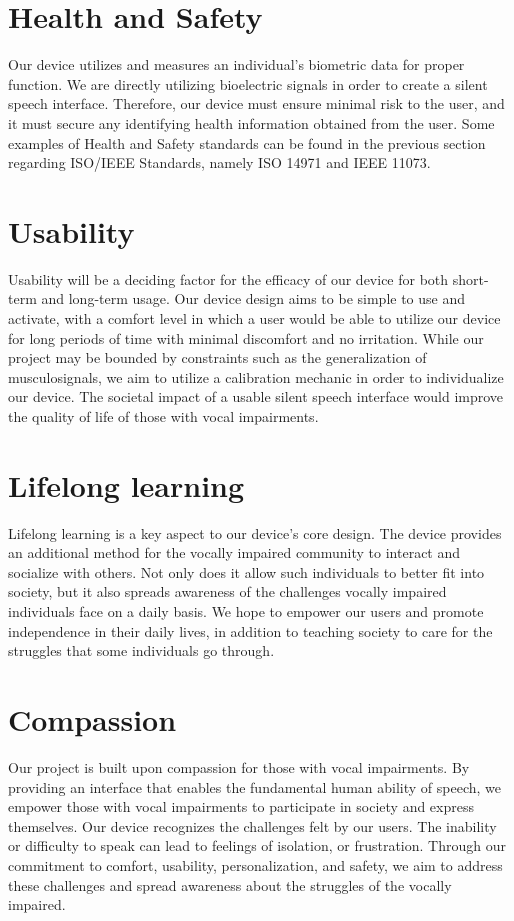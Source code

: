 \section{Health and Safety}
Our device utilizes and measures an individual's biometric data for proper function. We are directly utilizing bioelectric signals
 in order to create a silent speech interface. Therefore, our device must ensure minimal risk to the user, and it must secure any
 identifying health information obtained from the user. Some examples of Health and Safety standards can be found in the previous
 section regarding ISO/IEEE Standards, namely ISO 14971 and IEEE 11073.

\section{Usability} 
Usability will be a deciding factor for the efficacy of our device for both short-term and long-term usage. Our device design aims to be simple to use and activate,
 with a comfort level in which a user would be able to utilize our device for long periods of time with minimal discomfort and no irritation. While our project may be bounded by constraints such
 as the generalization of musculosignals, we aim to utilize a calibration mechanic in order to individualize our device. The societal impact of a usable silent speech interface would
 improve the quality of life of those with vocal impairments.

\section{Lifelong learning}
Lifelong learning is a key aspect to our device's core design. The device provides an additional method for the vocally impaired community to interact and socialize with others.
 Not only does it allow such individuals to better fit into society, but it also spreads awareness of the challenges vocally impaired individuals face on a daily basis. We hope to
empower our users and promote independence in their daily lives, in addition to teaching society to care for the struggles that some individuals go through.


\section{Compassion}
Our project is built upon compassion for those with vocal impairments. By providing an interface that enables the fundamental human
 ability of speech, we empower those with vocal impairments to participate in society and express themselves. Our device recognizes
 the challenges felt by our users. The inability or difficulty to speak can lead to feelings of isolation, or frustration. Through
 our commitment to comfort, usability, personalization, and safety, we aim to address these challenges and spread awareness about
 the struggles of the vocally impaired.